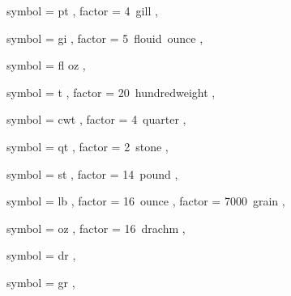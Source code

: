  {
	symbol = { pt } ,
	factor = { 4~gill } ,
}

 {
	symbol = { gi } ,
	factor = { 5~flouid~ounce } ,
}

 {
	symbol = { fl oz } ,
}


 {
	symbol = { t } ,
	factor = { 20~hundredweight } ,
}

 {
	symbol = { cwt } ,
	factor = { 4~quarter } ,
}

 {
	symbol = { qt } ,
	factor = { 2~stone } ,
}

 {
	symbol = { st } ,
	factor = { 14~pound } ,
}

 {
	symbol = { lb } ,
	factor = { 16~ounce } ,
	factor = { 7000~grain } ,
}

 {
	symbol = { oz } ,
	factor = { 16~drachm } ,
}

 {
	symbol = { dr } ,
}

 {
	symbol = { gr } ,
}

